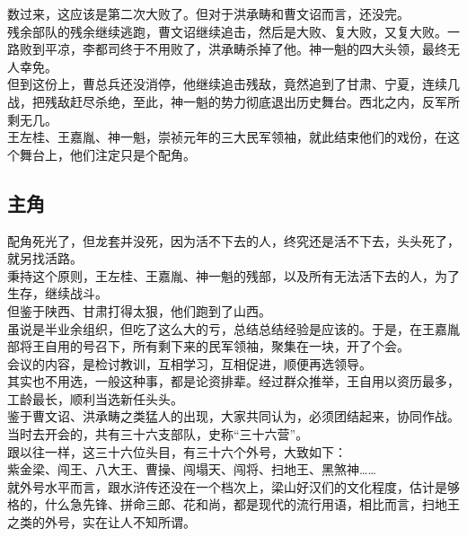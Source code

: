 \begin{multicols}{\theparacolNo}
数过来，这应该是第二次大败了。但对于洪承畴和曹文诏而言，还没完。\\

残余部队的残余继续逃跑，曹文诏继续追击，然后是大败、复大败，又复大败。一路败到平凉，李都司终于不用败了，洪承畴杀掉了他。神一魁的四大头领，最终无人幸免。\\

但到这份上，曹总兵还没消停，他继续追击残敌，竟然追到了甘肃、宁夏，连续几战，把残敌赶尽杀绝，至此，神一魁的势力彻底退出历史舞台。西北之内，反军所剩无几。\\

王左桂、王嘉胤、神一魁，崇祯元年的三大民军领袖，就此结束他们的戏份，在这个舞台上，他们注定只是个配角。\\

\subsection{主角}
配角死光了，但龙套并没死，因为活不下去的人，终究还是活不下去，头头死了，就另找活路。\\

秉持这个原则，王左桂、王嘉胤、神一魁的残部，以及所有无法活下去的人，为了生存，继续战斗。\\

但鉴于陕西、甘肃打得太狠，他们跑到了山西。\\

虽说是半业余组织，但吃了这么大的亏，总结总结经验是应该的。于是，在王嘉胤部将王自用的号召下，所有剩下来的民军领袖，聚集在一块，开了个会。\\

会议的内容，是检讨教训，互相学习，互相促进，顺便再选领导。\\

其实也不用选，一般这种事，都是论资排辈。经过群众推举，王自用以资历最多，工龄最长，顺利当选新任头头。\\

鉴于曹文诏、洪承畴之类猛人的出现，大家共同认为，必须团结起来，协同作战。\\

当时去开会的，共有三十六支部队，史称“三十六营”。\\

跟以往一样，这三十六位头目，有三十六个外号，大致如下：\\

紫金梁、闯王、八大王、曹操、闯塌天、闯将、扫地王、黑煞神……\\

就外号水平而言，跟水浒传还没在一个档次上，梁山好汉们的文化程度，估计是够格的，什么急先锋、拼命三郎、花和尚，都是现代的流行用语，相比而言，扫地王之类的外号，实在让人不知所谓。\\


\end{multicols}
